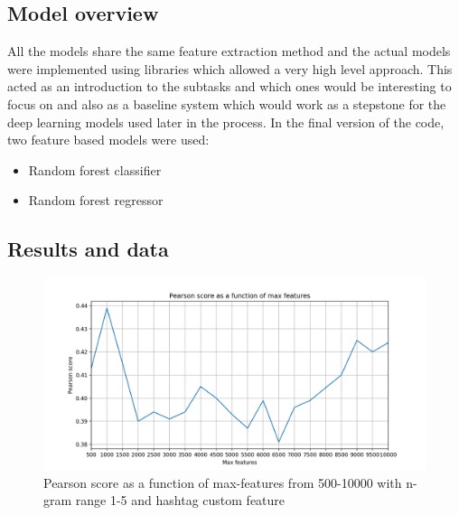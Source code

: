 \subsection{Model overview}
All the models share the same feature extraction method and the actual models were implemented using libraries which allowed a very high level approach. This acted as an introduction to the subtasks and which ones would be interesting to focus on and also as a baseline system which would work as a stepstone for the deep learning models used later in the process. In the final version of the code, two feature based models were used:\\
\begin{itemize}
 \item Random forest classifier
 \item Random forest regressor
\end{itemize}

\subsection{Results and data}
\begin{figure}[H]
    \centering
        \includegraphics[width=\textwidth]{pictures/max_f_ngram15_hashtag.png}
        \caption{Pearson score as a function of max-features from 500-10000 with n-gram range 1-5 and hashtag custom feature}
        \label{fig:max_f_ngram15_hashtag}
\end{figure}